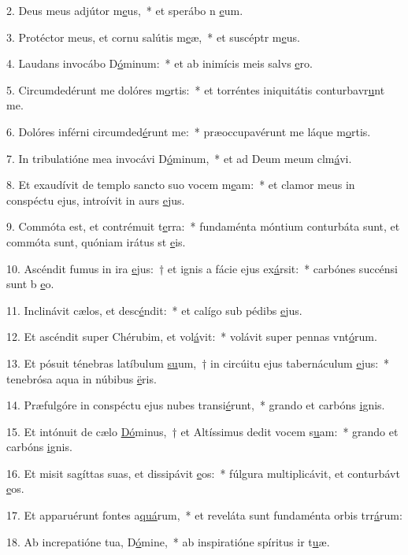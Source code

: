 2. Deus meus adjútor m\uline{e}us,~* et sperábo n \uline{e}um.\par 
3. Protéctor meus, et cornu salútis m\uline{e}æ,~* et suscéptr m\uline{e}us.\par 
4. Laudans invocábo D\uline{ó}minum:~* et ab inimícis meis salvs \uline{e}ro.\par 
5. Circumdedérunt me dolóres m\uline{o}rtis:~* et torréntes iniquitátis conturbavr\uline{u}nt me.\par 
6. Dolóres inférni circumded\uline{é}runt me:~* præoccupavérunt me láque m\uline{o}rtis.\par 
7. In tribulatióne mea invocávi D\uline{ó}minum,~* et ad Deum meum clm\uline{á}vi.\par 
8. Et exaudívit de templo sancto suo vocem m\uline{e}am:~* et clamor meus in conspéctu ejus, introívit in aurs \uline{e}jus.\par 
9. Commóta est, et contrémuit t\uline{e}rra:~* fundaménta móntium conturbáta sunt, et commóta sunt, quóniam irátus st \uline{e}is.\par 
10. Ascéndit fumus in ira \uline{e}jus:~† et ignis a fácie ejus ex\uline{á}rsit:~* carbónes succénsi sunt b \uline{e}o.\par 
11. Inclinávit cælos, et desc\uline{é}ndit:~* et calígo sub pédibs \uline{e}jus.\par 
12. Et ascéndit super Chérubim, et vol\uline{á}vit:~* volávit super pennas vnt\uline{ó}rum.\par 
13. Et pósuit ténebras latíbulum \uline{su}um,~† in circúitu ejus tabernáculum \uline{e}jus:~* tenebrósa aqua in núbibus \uline{ë}ris.\par 
14. Præfulgóre in conspéctu ejus nubes transi\uline{é}runt,~* grando et carbóns \uline{i}gnis.\par 
15. Et intónuit de cælo \uline{Dó}minus,~† et Altíssimus dedit vocem s\uline{u}am:~* grando et carbóns \uline{i}gnis.\par 
16. Et misit sagíttas suas, et dissipávit \uline{e}os:~* fúlgura multiplicávit, et conturbávt \uline{e}os.\par 
17. Et apparuérunt fontes a\uline{quá}rum,~* et reveláta sunt fundaménta orbis trr\uline{á}rum:\par 
18. Ab increpatióne tua, D\uline{ó}mine,~* ab inspiratióne spíritus ir t\uline{u}æ.\par 
